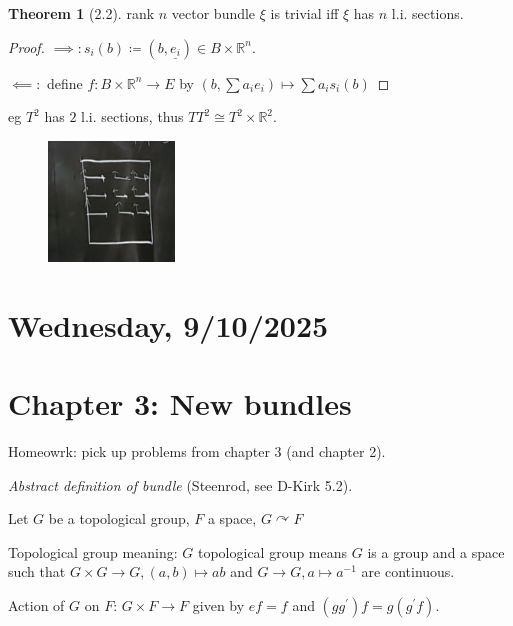 \documentclass{article}
\theoremstyle{definition}
\newtheorem{theorem}{Theorem}
\begin{document}
    \begin{theorem}
        [2.2] rank \(n\) vector bundle \(\xi \) is trivial iff \(\xi \) has \(n\) l.i. sections.
    \end{theorem}

    \begin{proof}
        \(\implies: s_i(b) \coloneqq (b,\underline{e_i}) \in B \times \mathbb{R}^n\).
        
        \(\impliedby:\) define \(f: B \times \mathbb{R}^n \to E\) by \(\left( b, \sum a_i e_i \right) \mapsto \sum a_i s_i(b)\) 
    \end{proof}

    eg \(T^2\) has \(2\) l.i. sections, thus \(TT^2 \cong T^2 \times \mathbb{R}^2\).

    \begin{figure}[H]
        \centering
        \includegraphics[width=0.3\textwidth]{img/trivialtorus}
        \caption{}
    \end{figure}

    \section*{Wednesday, 9/10/2025}
    
    \section*{Chapter 3: New bundles}

    Homeowrk: pick up problems from chapter 3 (and chapter 2).

    \textit{Abstract definition of bundle} (Steenrod, see D-Kirk 5.2).

    Let \(G\) be a topological group, \(F\) a space, \(G \curvearrowright F\)

    Topological group meaning: \(G\) topological group means \(G\) is a group and a space such that \(G \times G \to G, (a,b) \mapsto ab\) and \(G \to G, a \mapsto a ^{-1}\) are continuous.

    Action of \(G\) on \(F\): \(G \times F \to F\) given by \(ef = f\) and \((gg^{\prime})f = g (g^{\prime} f)\).
\end{document}
